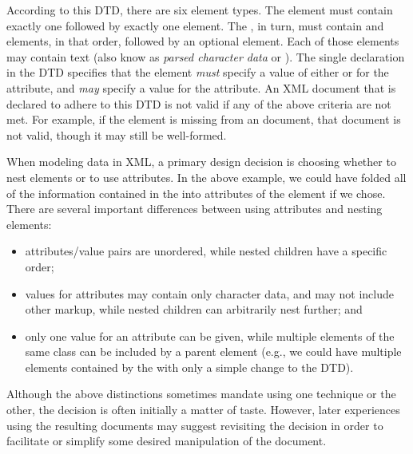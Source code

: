 \documentclass{article}
\begin{document}
According to this DTD, there are six element types. The
 element must contain exactly one 
followed by exactly one  element.  The
, in turn, must contain  and
 elements, in that order, followed by an optional
 element.  Each of those elements may contain text 
(also know as \emph{parsed
character data} or ).  The single 
declaration in the DTD specifies that the  element
\emph{must} specify a value of either  or
 for the  attribute, and
\emph{may} specify a value for the  attribute.
An XML document that is declared to adhere to this DTD is not valid if
any of the above criteria are not met.  For example, if the
 element is missing from an  document,
that document is not valid, though it may still be well-formed.

When modeling data in XML, a primary design decision is choosing whether
to nest elements or to use attributes.  In the above example, we could
have folded all of the information contained in the 
into attributes of the  element if we chose.  There
are several important differences between using attributes and nesting
elements:

\begin{itemize}

\item attributes/value pairs are unordered, while nested children have a
specific order;

\item values for attributes may contain only character data, and may not
include other markup, while nested children can arbitrarily nest
further; and

\item only one value for an attribute can be given, while multiple
elements of the same class can be included by a parent element (e.g., we
could have multiple  elements contained by the
 with only a simple change to the DTD).

\end{itemize}

Although the above distinctions sometimes mandate using one technique or
the other, the decision is often initially a matter of taste.  However,
later experiences using the resulting documents may suggest
revisiting the decision in order to facilitate or simplify
some desired manipulation of the document.
\end{document}
